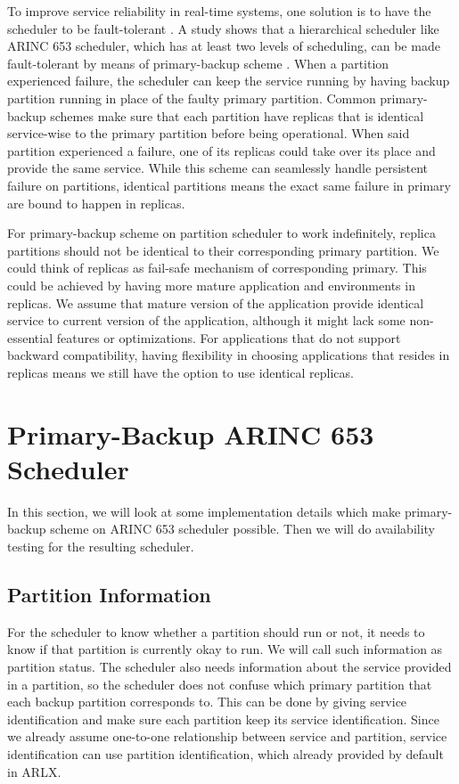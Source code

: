 \documentclass[conference]{IEEEtran}
\begin{document}
To improve service reliability in real-time systems, one solution is to have the scheduler to be
fault-tolerant \cite{Campbell1986} \cite{Han2003} \cite{Shin2008}. A study shows that a
hierarchical scheduler like ARINC 653 scheduler, which has at least two levels of scheduling,
can be made fault-tolerant by means of primary-backup scheme \cite{Jin2013}. When a partition
experienced failure, the scheduler can keep the service running by having backup partition
running in place of the faulty primary partition. Common primary-backup schemes make sure that
each partition have replicas that is identical service-wise to the primary partition before
being operational. When said partition experienced a failure, one of its replicas could take
over its place and provide the same service. While this scheme can seamlessly handle persistent
failure on partitions, identical partitions means the exact same failure in primary are bound to
happen in replicas.

For primary-backup scheme on partition scheduler to work indefinitely, replica partitions should
not be identical to their corresponding primary partition. We could think of replicas as
fail-safe mechanism of corresponding primary. This could be achieved by having more mature
application and environments in replicas. We assume that mature version of the application
provide identical service to current version of the application, although it might lack some
non-essential features or optimizations. For applications that do not support backward
compatibility, having flexibility in choosing applications that resides in replicas means we
still have the option to use identical replicas.

\section{Primary-Backup ARINC 653 Scheduler}

In this section, we will look at some implementation details which make primary-backup scheme on
ARINC 653 scheduler possible. Then we will do availability testing for the resulting scheduler.

\subsection{Partition Information}

For the scheduler to know whether a partition should run or not, it needs to know if that
partition is currently okay to run. We will call such information as partition status. The
scheduler also needs information about the service provided in a partition, so the scheduler
does not confuse which primary partition that each backup partition corresponds to. This can be
done by giving service identification and make sure each partition keep its service
identification. Since we already assume one-to-one relationship between service and partition,
service identification can use partition identification, which already provided by default in
ARLX.
\end{document}
